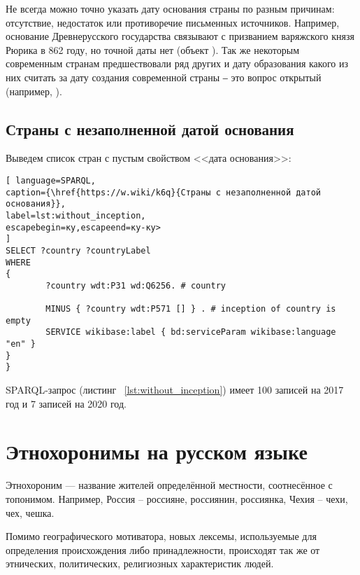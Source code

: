 Не всегда можно точно указать дату основания страны по разным причинам: отсутствие, недостаток или противоречие письменных источников. Например, основание Древнерусского государства связывают с призванием варяжского князя Рюрика в 862 году, но точной даты нет (объект ). Так же некоторым современным странам предшествовали ряд других и дату образования какого из них считать за дату создания современной страны ‒ это вопрос открытый (например, ).

\subsection{Страны с незаполненной датой основания}

Выведем список стран с пустым свойством <<дата основания>>:



\begin{lstlisting}[ language=SPARQL, 
caption={\href{https://w.wiki/k6q}{Страны с незаполненной датой основания}},
label=lst:without_inception, 
escapebegin=ку,escapeend=ку-ку>
]
SELECT ?country ?countryLabel 
WHERE
{
		?country wdt:P31 wd:Q6256. # country
		
		MINUS { ?country wdt:P571 [] } . # inception of country is empty
		SERVICE wikibase:label { bd:serviceParam wikibase:language "en" }
}
}
\end{lstlisting}

SPARQL-запрос (листинг ~\ref{lst:without_inception}) имеет 100 записей на 2017 год и 7 записей на 2020 год.
\section{Этнохоронимы на русском языке}

Этнохороним — название жителей определённой местности, соотнесённое с топонимом. Например, Россия – россияне, россиянин, россиянка, Чехия – чехи, чех, чешка.

Помимо географического мотиватора, новых лексемы, используемые для определения происхождения либо принадлежности, происходят так же от этнических, политических, религиозных характеристик людей\cite{country_2}. 

